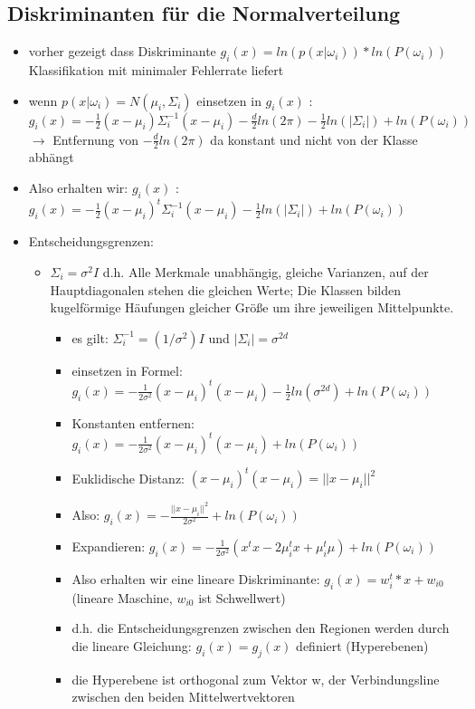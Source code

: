\documentclass{article} %
\begin{document}
	\subsection{Diskriminanten für die Normalverteilung}
	\begin{itemize}
		\item vorher gezeigt dass Diskriminante $g_i(x) = ln(p(x|\omega_i))*ln(P(\omega_i))$ Klassifikation mit minimaler Fehlerrate liefert
		\item wenn $p(x|\omega_i) = N(\mu_i,\Sigma_i)$ einsetzen in $g_i(x)$ : $g_i(x) = -\frac{1}{2}(x-\mu_i)\Sigma_i^{-1}(x-\mu_i)-\frac{d}{2}ln(2\pi)-\frac{1}{2} ln(|\Sigma_i|)+ln(P(\omega_i))$ $\rightarrow$ Entfernung von $-\frac{d}{2}ln(2\pi)$ da konstant und nicht von der Klasse abhängt
		\item Also erhalten wir: $g_i(x)$ : $g_i(x) = -\frac{1}{2}(x-\mu_i)^t\Sigma_i^{-1}(x-\mu_i)-\frac{1}{2} ln(|\Sigma_i|)+ln(P(\omega_i))$
		\item Entscheidungsgrenzen:
		\begin{itemize}
			\item $\Sigma_i = \sigma^2I$ d.h. Alle Merkmale unabhängig, gleiche Varianzen, auf der Hauptdiagonalen stehen die gleichen Werte; Die Klassen bilden kugelförmige Häufungen gleicher Größe um ihre jeweiligen Mittelpunkte.
			\begin{itemize}
				\item es gilt: $\Sigma_i^{-1} = (1/\sigma^2)I$ und $|\Sigma_i| = \sigma^{2d}$
				\item einsetzen in Formel: $g_i(x) = -\frac{1}{2\sigma^2}(x-\mu_i)^t(x-\mu_i)-\frac{1}{2} ln(\sigma^{2d})+ln(P(\omega_i))$ 
				\item Konstanten entfernen: $g_i(x) = -\frac{1}{2\sigma^2}(x-\mu_i)^t(x-\mu_i)+ln(P(\omega_i))$ 
				\item Euklidische Distanz: $(x-\mu_i)^t(x-\mu_i) = ||x-\mu_i||^2$
				\item Also:  $g_i(x) = -\frac{||x-\mu_i||^2}{2\sigma^2}+ln(P(\omega_i))$ 
				\item Expandieren:  $g_i(x) = -\frac{1}{2\sigma^2}(x^tx-2\mu_i^tx+\mu_i^t\mu)+ln(P(\omega_i))$ 
				\item Also erhalten wir eine lineare Diskriminante: $g_i(x) = w_i^t*x+ w_{i0}$ (lineare Maschine, $w_{i0}$ ist Schwellwert)
				\item d.h. die Entscheidungsgrenzen zwischen den Regionen werden durch die lineare Gleichung: $g_i(x) = g_j(x)$ definiert (Hyperebenen)
				\item die Hyperebene ist orthogonal zum Vektor w, der Verbindungsline zwischen den beiden Mittelwertvektoren

\end{itemize}
\end{itemize}
\end{itemize}
\end{document}
